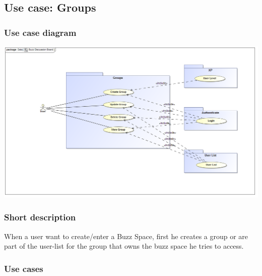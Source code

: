 

\subsection{Use case: Groups}
	\subsubsection{Use case diagram}
\includegraphics[width=\textwidth]{groups}
	\subsubsection{Short description}
	\begin{description}
		\item When a user want to create/enter a Buzz Space, first he creates a group or are part of the user-list for the group that owns the buzz space he tries to access. 
	\end{description}
	\subsubsection{Use cases}

